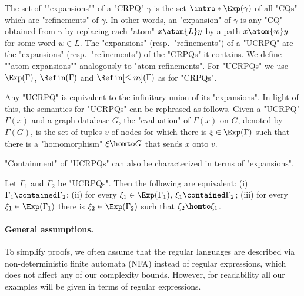 The set of \AP""expansions"" of a "CRPQ" $\gamma$ is the set $\intro*\Exp(\gamma)$ of all "CQs" which are "refinements" of $\gamma$.
In other words, an "expansion" of $\gamma$ is any "CQ" obtained from $\gamma$
by replacing each "atom" $x \atom{L} y$ by a path $x \atom{w} y$ for some
word $w \in L$. The "expansions" (resp.\ "refinements") of a "UCRPQ" are the "expansions" (resp.\ "refinements") of the "CRPQs" it contains.
We define \AP""atom expansions"" analogously to "atom refinements". For "UCRPQs" we use  $\Exp(\Gamma)$, $\Refin(\Gamma)$ and $\Refin[\leq m](\Gamma)$ as for "CRPQs".

Any "UCRPQ" is equivalent to the infinitary union of its "expansions". In light of this, 
the semantics for "UCRPQs" can be rephrased as follows. 
Given a "UCRPQ" $\Gamma(\bar x)$ and a graph database $G$, 
the "evaluation" of $\Gamma(\bar x)$ on $G$, denoted by $\Gamma(G)$, is the set of tuples 
$\bar{v}$ of nodes for which there is $\anexpansion \in \Exp(\Gamma)$ such that there is a "homomorphism" $\anexpansion \homto G$ that sends $\bar x$ onto $\bar v$. 

"Containment" of "UCRPQs" can also be characterized in terms of "expansions".
\begin{proposition}
	\AP\label{prop:cont-char-exp-st} 
	Let $\Gamma_1$ and $\Gamma_2$ be "UCRPQs". Then the following are equivalent:
		(i) $\Gamma_1 \contained \Gamma_2$;
		(ii) for every $\anexpansion_1\in \Exp(\Gamma_1)$, $\anexpansion_1 \contained \Gamma_2$;
		(iii) for every $\anexpansion_1\in \Exp(\Gamma_1)$ there is $\anexpansion_2\in \Exp(\Gamma_2)$ such that $\anexpansion_2\homto \anexpansion_1$. 
\end{proposition}


\paragraph*{General assumptions.}
To simplify proofs, we often assume that the regular languages are described via non-deterministic finite automata (NFA) instead of regular expressions,
which does not affect any of our complexity bounds.
However, for readability all our examples will be given in terms of regular expressions.

